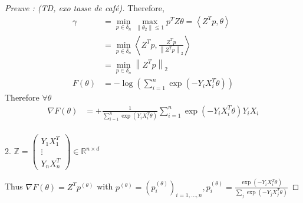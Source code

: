 \begin{proof}[Preuve : (TD, exo tasse de café)]
    Therefore,
    \begin{align*}
        \gamma 
            &= \min _{p \in \delta _n} \max _{\left\| \theta _2 \right\| \leq 1} p^T Z \theta = \left\langle Z^T p, \theta  \right\rangle  \\
            &= \min _{p \in \delta _n} \left\langle Z^Tp, \frac{Z^T p }{\left\| Z^T p  \right\| _2} \right\rangle \\
            &= \min _{p \in \delta _n} \left\| Z^T p  \right\| _2 \\
        F(\theta ) &= - \log (\sum_{i=1}^{n } \exp (-Y_i X_i^T \theta )) 
    \end{align*}
    Therefore $ \forall \theta  $ 
    \begin{align*}
        \nabla F(\theta ) 
            &= + \frac{1}{\sum_{i=1}^{n} \exp (Y_i X_i ^T \theta )} \sum_{i=1}^{n} \exp (-Y_i X_i ^T \theta )Y_i X_i \\
    \end{align*}

    2. $ \mathbb{Z} = \begin{pmatrix}
        Y_1 X_1^T \\
        \vdots \\
        Y_n X_n^T
    \end{pmatrix} \in \mathbb{R}^{n \times d}
    $

    Thus $ \nabla F(\theta ) = Z^T p^{(\theta )} $ with $ p^{(\theta )} = (p_i^{(\theta )})_{i=1, \dots, n}, p_i^{(\theta )} = \frac{\exp (-Y_i X_i^T \theta )}{\sum_{j} \exp (-Y_j X_j^T \theta )} $ 
\end{proof}


